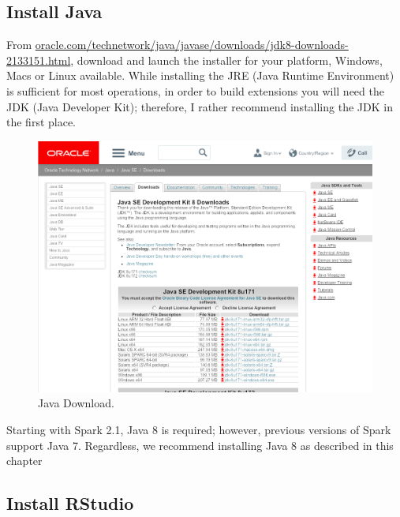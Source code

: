 \documentclass[]{book}
\theoremstyle{definition}
\theoremstyle{definition}
\theoremstyle{definition}
\theoremstyle{remark}
\begin{document}
\hypertarget{install-java}{%
\subsection{Install Java}\label{install-java}}

From
\href{http://www.oracle.com/technetwork/java/javase/downloads/jdk8-downloads-2133151.html}{oracle.com/technetwork/java/javase/downloads/jdk8-downloads-2133151.html},
download and launch the installer for your platform, Windows, Macs or
Linux available. While installing the JRE (Java Runtime Environment) is
sufficient for most operations, in order to build extensions you will
need the JDK (Java Developer Kit); therefore, I rather recommend
installing the JDK in the first place.

\begin{figure}

{\centering \includegraphics[width=13.78in]{images/02-getting-started-jdk-8} 

}

\caption{Java Download.}\label{fig:java-download}
\end{figure}

Starting with Spark 2.1, Java 8 is required; however, previous versions
of Spark support Java 7. Regardless, we recommend installing Java 8 as
described in this chapter

\hypertarget{install-rstudio}{%
\subsection{Install RStudio}\label{install-rstudio}}
\end{document}
